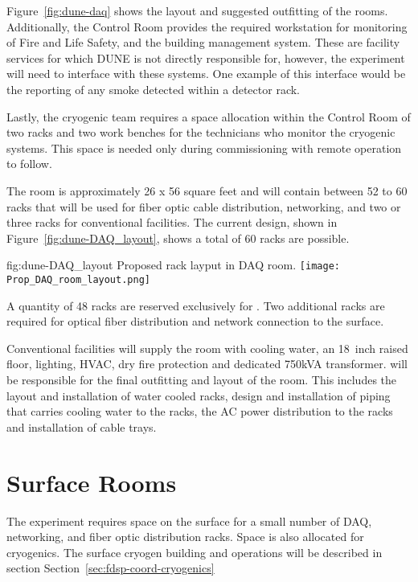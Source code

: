 Figure~\ref{fig:dune-daq} shows the layout and suggested outfitting of
the rooms. Additionally, the Control Room provides the required
workstation for monitoring of Fire and Life Safety, and the building
management system.  These are facility services for which DUNE is not
directly responsible for, however, the experiment will need to
interface with these systems.  One example of this interface would be
the reporting of any smoke detected within a detector rack.

Lastly, the cryogenic team requires a space allocation within the
Control Room of two racks and two work benches for the technicians who
monitor the cryogenic systems.  This space is needed only during
commissioning with remote operation to follow.
       
The  room is approximately 26 x 56 square feet and will
contain between 52 to 60 racks that will be used for fiber optic cable
distribution, networking,   and two or three
racks for conventional facilities.  The current design, shown in
Figure~\ref{fig:dune-DAQ_layout}, shows a total of 60 racks are
possible.
\begin{dunefigure}{fig:dune-DAQ_layout}
  {Proposed rack layput in DAQ room.}
  \texttt{[image: Prop\_DAQ\_room\_layout.png]}
\end{dunefigure}
  

A quantity of 48 racks are reserved exclusively for .  Two
additional racks are required for optical fiber distribution and
network connection to the surface.

Conventional facilities will supply the  room with cooling
water, an 18~inch raised floor, lighting, HVAC, dry fire protection
and dedicated 750kVA transformer.   will be responsible for
the final outfitting and layout of the room.  This includes the layout
and installation of water cooled racks, design and installation of
piping that carries cooling water to the racks, the AC power
distribution to the racks and installation of cable trays.

\section{Surface Rooms}
\label{sec:fdsp-coord-surf-rooms}

The  experiment requires space on the surface for a small
number of DAQ, networking, and fiber optic distribution racks.  Space
is also allocated for cryogenics.  The surface cryogen building and
operations will be described in section
Section~\ref{sec:fdsp-coord-cryogenics}

